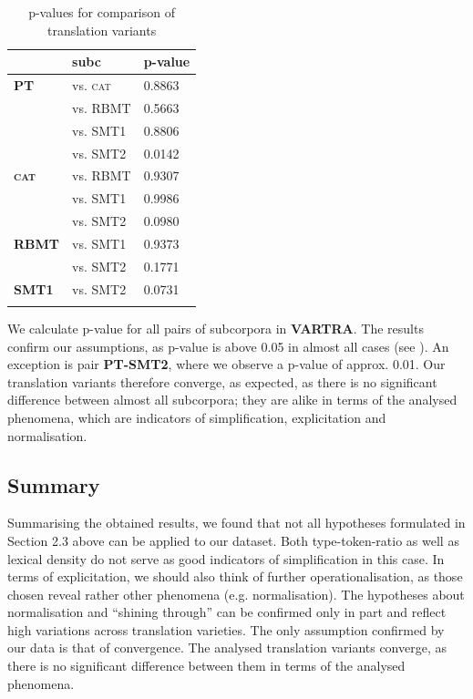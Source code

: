 \documentclass[output=paper]{LSP/langsci}
\begin{document}
{\begin{table}
     \centering
     \begin{tabular}{lll}
          \lsptoprule
               & \textbf{subc}    & \textbf{p-value}  \\ \midrule
\textbf{PT}	   & vs. \textsc{cat}   & 0.8863     \\ 
	  	       & vs. RBMT  & 0.5663      \\ 
		       & vs. SMT1  & 0.8806       \\
		       & vs. SMT2  & 0.0142        \\ \midrule
\textbf{\textsc{cat}}   & vs. RBMT  & 0.9307         \\ 
			   & vs. SMT1  & 0.9986  		 \\
			   & vs. SMT2  & 0.0980           \\ \midrule
\textbf{RBMT}  & vs. SMT1  & 0.9373            \\ 
			   & vs. SMT2  & 0.1771			    \\ \midrule
\textbf{SMT1}  & vs. SMT2  & 0.0731 	         \\ 
\lspbottomrule
     \end{tabular}

 \caption{p-values for comparison of translation variants}
     \label{tab:4.5}
\end{table}   

We calculate p-value for all pairs of subcorpora in \textbf{VARTRA}. The results confirm our assumptions, as p-value is above 0.05 in almost all cases (see ). An exception is pair \textbf{PT-SMT2}, where we observe a p-value of approx. 0.01. Our translation variants therefore converge, as expected, as there is no significant difference between almost all subcorpora; they are alike in terms of the analysed phenomena, which are indicators of simplification, explicitation and normalisation.

\subsection{Summary}

Summarising the obtained results, we found that not all hypotheses formulated in Section 2.3 above can be applied to our dataset. Both type-token-ratio as well as lexical density do not serve as good indicators of simplification in this case. In terms of explicitation, we should also think of further operationalisation, as those chosen reveal rather other phenomena (e.g. normalisation).  The hypotheses about normalisation and “shining through” can be confirmed only in part and reflect high variations across translation varieties.  The only assumption confirmed by our data is that of convergence.  The analysed translation variants converge, as there is no significant difference between them in terms of the analysed phenomena.

}
\end{document}
